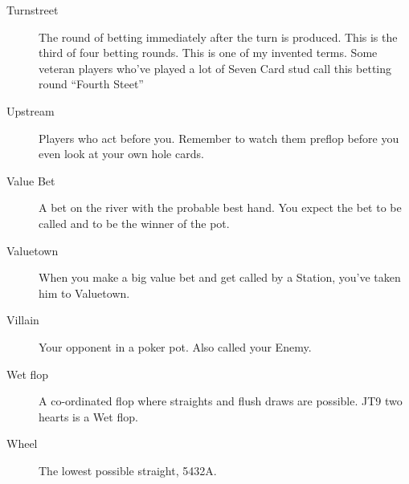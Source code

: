 \begin{description}
\item[Turnstreet] The round of betting immediately after the turn is
produced. This is the third of four betting rounds. This is one
of my invented terms. Some veteran players who've played a lot of
Seven Card stud call this betting round ``Fourth Steet''

\item[Upstream] Players who act before you. Remember to watch them
preflop before you even look at your own hole cards.

\item[Value Bet] A bet on the river with the probable best hand. You
expect the bet to be called and to be the winner of the pot.

\item[Valuetown] When you make a big value bet and get called by
a Station, you've taken him to Valuetown.

\item[Villain] Your opponent in a poker pot. Also called your Enemy.

\item[Wet flop] A co-ordinated flop where straights and flush draws
are possible. JT9 two hearts is a Wet flop.

\item[Wheel] The lowest possible straight, 5432A.

\end{description}
